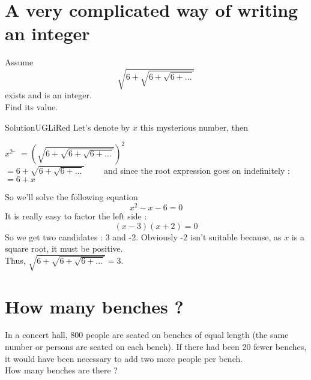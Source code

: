 \documentclass[12pt,a4paper,article,english,firamath]{nsi}
\begin{document}
\section*{A very complicated way of writing an integer}

Assume $$\sqrt{6+\sqrt{6+\sqrt{6+\ldots}}}$$ exists and is an integer.\\
Find its value.

\begin{encadrecolore}{Solution}{UGLiRed}
    Let's denote by $x$ this mysterious number, then
    \begin{tabbing}
        $ x^2 $ 	\= $= \left(\sqrt{6+\sqrt{6+\sqrt{6+\ldots}}}\right)^2$ \\
        \> $= 6+\sqrt{6+\sqrt{6+\ldots}}\qquad$ and since the root expression goes on indefinitely :\\
        \> $= 6 +x$
    \end{tabbing}
    So we'll solve the following equation $$x^2-x-6 = 0$$
    It is really easy to factor the left side : $$(x-3)(x+2)=0$$
    So we get two candidates : 3 and -2. Obviously -2 isn't suitable because, as $x$ is a square root, it must be positive.\\

    Thus, $\sqrt{6+\sqrt{6+\sqrt{6+\ldots}}}=3$.
\end{encadrecolore}


\section*{How many benches ?}
In a concert hall, 800 people are seated on benches of equal length (the same number or persons are seated on each bench). If there had been 20 fewer benches, it would have been necessary to add two more people per bench.\\
How many benches are there ?
\end{document}
